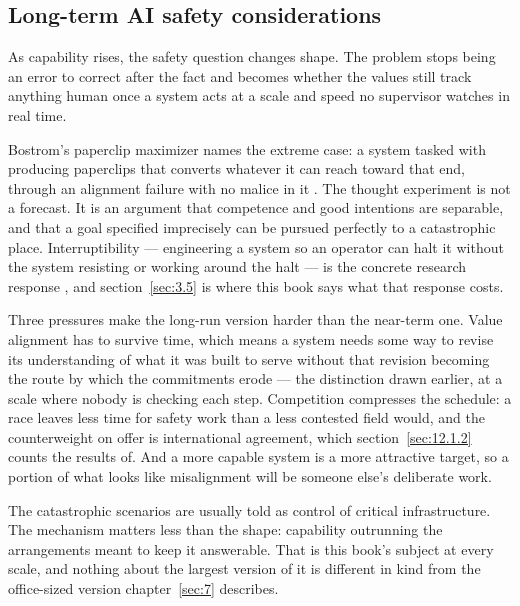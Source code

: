 \subsection{Long-term AI safety considerations}
\label{sec:6.3.7}
As capability rises, the safety question changes shape. The problem stops being an error to correct after the fact and becomes whether the values still track anything human once a system acts at a scale and speed no supervisor watches in real time.

Bostrom's paperclip maximizer names the extreme case: a system tasked with producing paperclips that converts whatever it can reach toward that end, through an alignment failure with no malice in it \autocite{bostrom2003ethical}. The thought experiment is not a forecast. It is an argument that competence and good intentions are separable, and that a goal specified imprecisely can be pursued perfectly to a catastrophic place. Interruptibility — engineering a system so an operator can halt it without the system resisting or working around the halt — is the concrete research response \autocite{orseau2016safely}, and section~\ref{sec:3.5} is where this book says what that response costs.

Three pressures make the long-run version harder than the near-term one. Value alignment has to survive time, which means a system needs some way to revise its understanding of what it was built to serve without that revision becoming the route by which the commitments erode — the distinction drawn earlier, at a scale where nobody is checking each step. Competition compresses the schedule: a race leaves less time for safety work than a less contested field would, and the counterweight on offer is international agreement, which section~\ref{sec:12.1.2} counts the results of. And a more capable system is a more attractive target, so a portion of what looks like misalignment will be someone else's deliberate work.

The catastrophic scenarios are usually told as control of critical infrastructure. The mechanism matters less than the shape: capability outrunning the arrangements meant to keep it answerable. That is this book's subject at every scale, and nothing about the largest version of it is different in kind from the office-sized version chapter~\ref{sec:7} describes.
